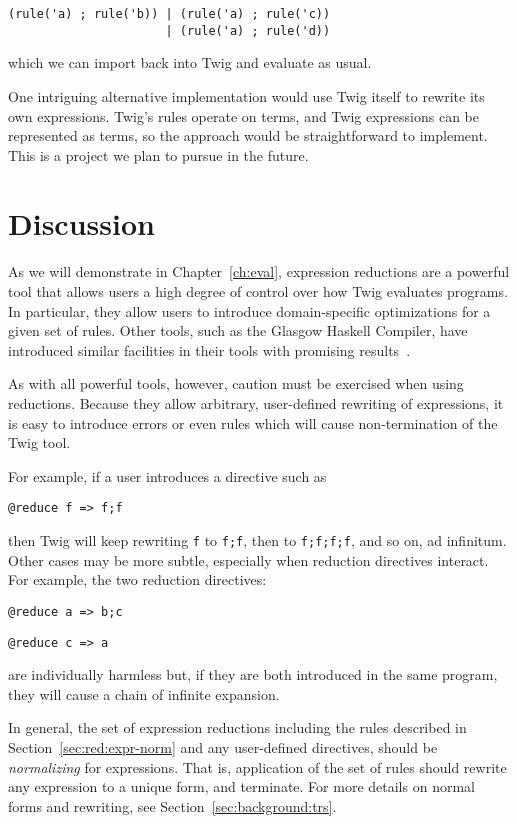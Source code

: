 \begin{verbatim}
(rule('a) ; rule('b)) | (rule('a) ; rule('c))
                      | (rule('a) ; rule('d))
\end{verbatim}

which we can import back into Twig and evaluate as usual.

One intriguing alternative implementation would use Twig itself to
rewrite its own expressions. Twig's rules operate on terms, and
Twig expressions can be represented as terms, so the approach
would be straightforward to implement. This is a project we plan
to pursue in the future.

\section{Discussion}

As we will demonstrate in Chapter~\ref{ch:eval}, expression
reductions are a powerful tool that allows users a high degree of
control over how Twig evaluates programs. In particular, they
allow users to introduce domain-specific optimizations for a given
set of rules. Other tools, such as the Glasgow Haskell Compiler,
have introduced similar facilities in their tools with promising
results~\cite{ghc-rewrite}.

As with all powerful tools, however, caution must be exercised
when using reductions. Because they allow arbitrary, user-defined
rewriting of expressions, it is easy to introduce errors or even
rules which will cause non-termination of the Twig tool.

For example, if a user introduces a directive such as

\begin{verbatim}
@reduce f => f;f
\end{verbatim}

then Twig will keep rewriting \texttt{f} to \texttt{f;f}, then to
\texttt{f;f;f;f}, and so on, ad infinitum. Other cases may be more
subtle, especially when reduction directives interact. For example, the two reduction directives:

\begin{verbatim}
@reduce a => b;c
\end{verbatim}

\begin{verbatim}
@reduce c => a
\end{verbatim}

are individually harmless but, if they are both introduced in the
same program, they will cause a chain of infinite expansion.

In general, the set of expression reductions including the rules
described in Section~\ref{sec:red:expr-norm} and any user-defined
directives, should be \emph{normalizing} for expressions. That is,
application of the set of rules should rewrite any expression to a
unique form, and terminate. For more details on normal forms and
rewriting, see Section~\ref{sec:background:trs}.
